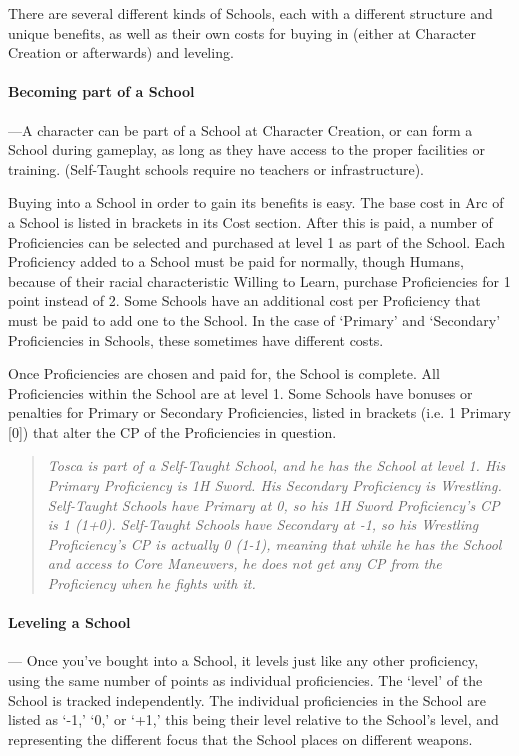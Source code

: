 \documentclass[oneside,11pt,english]{book}
\begin{document}
There are several different kinds of Schools, each with a different structure
and unique benefits, as well as their own costs for buying in (either at
Character Creation or afterwards) and leveling.

\paragraph{Becoming part of a School}---\quad A character can be part of a
School at Character Creation, or can form a School during gameplay, as long as
they have access to the proper facilities or training. (Self-Taught schools
require no teachers or infrastructure).

Buying into a School in order to gain its benefits is easy. The base cost in Arc
of a School is listed in brackets in its Cost section. After this is paid, a
number of Proficiencies can be selected and purchased at level 1 as part of the
School. Each Proficiency added to a School must be paid for normally, though
Humans, because of their racial characteristic Willing to Learn, purchase
Proficiencies for 1 point instead of 2. Some Schools have an additional cost per
Proficiency that must be paid to add one to the School. In the case of ‘Primary’
and ‘Secondary’ Proficiencies in Schools, these sometimes have different costs.

Once Proficiencies are chosen and paid for, the School is complete. All
Proficiencies within the School are at level 1. Some Schools have bonuses or
penalties for Primary or Secondary Proficiencies, listed in brackets (i.e. 1
Primary [0]) that alter the CP of the Proficiencies in
question. %

\begin{quote}
  \emph{Tosca is part of a Self-Taught School, and he has the School at level 1. His Primary Proficiency is 1H 
    Sword. His Secondary Proficiency is Wrestling.
    Self-Taught Schools have Primary at 0, so his 1H Sword Proficiency’s CP is 1 (1+0). Self-Taught Schools 
    have Secondary at -1, so his Wrestling Proficiency’s CP is actually 0 (1-1), meaning that while he has the 
    School and access to Core Maneuvers, he does not get any CP from the Proficiency when he fights with 
    it.}
\end{quote}
\paragraph{Leveling a School}---\quad
Once you’ve bought into a School, it levels just like any other proficiency, using the same number of 
points as individual proficiencies. The ‘level’ of the School is tracked independently. The individual 
proficiencies in the School are listed as ‘-1,’ ‘0,’ or ‘+1,’ this being their level relative to the School’s 
level, and representing the different focus that the School places on different weapons. 
\end{document}
